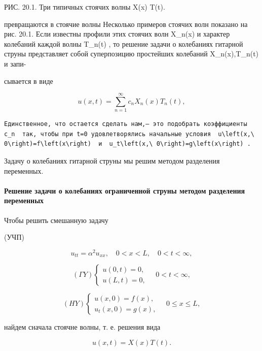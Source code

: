 \documentclass[
  ukrainian,
]{article}
\begin{document}
РИС. 20.1. Три типичных стоячих волны X(x) T(t).

превращаются в стоячие волны Несколько примеров стоячих волн показано на
рис. 20.1. Если известны профили этих стоячих волн X\_n(x) и характер
колебаний каждой волны T\_n(t) , то решение задачи о колебаниях гитарной
струны представляет собой суперпозицию простейших колебаний
X\_n(x),T\_n(t) и запи-

сывается в виде

\[
u(x, t) = \sum_{n=1}^{\infty} c_n X_n(x) T_n(t),
\]

\begin{verbatim}
Единственное, что остается сделать нам,— это подобрать коэффициенты  c_n  так, чтобы при t=0 удовлетворялись начальные условия  u\left(x,\ 0\right)=f\left(x\right)  и  u_t\left(x,\ 0\right)=g\left(x\right) .
\end{verbatim}

Задачу о колебаниях гитарной струны мы решим методом разделения
переменных.

\paragraph{Решение задачи о колебаниях ограниченной струны методом
разделения
переменных}\label{ux440ux435ux448ux435ux43dux438ux435-ux437ux430ux434ux430ux447ux438-ux43e-ux43aux43eux43bux435ux431ux430ux43dux438ux44fux445-ux43eux433ux440ux430ux43dux438ux447ux435ux43dux43dux43eux439-ux441ux442ux440ux443ux43dux44b-ux43cux435ux442ux43eux434ux43eux43c-ux440ux430ux437ux434ux435ux43bux435ux43dux438ux44f-ux43fux435ux440ux435ux43cux435ux43dux43dux44bux445}

Чтобы решить смешанную задачу

(УЧП)

\[
u_{tt} = \alpha^2 u_{xx}, \quad 0 < x < L, \quad 0 < t < \infty,
\]

\[
(\Gamma Y) \begin{cases} u(0, t) = 0, \\ u(L, t) = 0, \end{cases} \quad 0 < t < \infty,
\]

\[
(HY) \begin{cases} u(x, 0) = f(x), \\ u_t(x, 0) = g(x), \end{cases} \quad 0 \le x \le L,
\]

найдем сначала стоячне волны, т. е. решения вида

\[
u(x, t) = X(x) T(t).
\]
\end{document}
